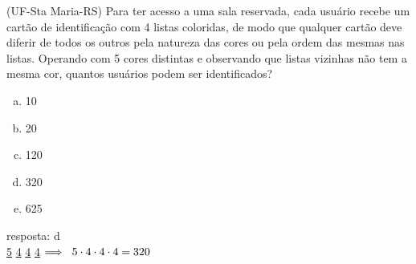 \begin{ex}
 (UF-Sta Maria-RS) Para ter acesso a uma sala reservada, cada usuário recebe um cartão de identificação com 4 listas coloridas, de modo que qualquer cartão deve diferir de todos os outros pela natureza das cores ou pela ordem das mesmas nas listas. Operando com 5 cores distintas e observando que listas vizinhas não tem a mesma cor, quantos usuários podem ser identificados?
    \begin{enumerate}[(a)]
    \item 10
    \item 20
    \item 120
    \item 320
    \item 625
    \end{enumerate}
      \begin{sol}
      resposta: d  \\
        \underline{5}\hspace{0.2cm} \underline{4} \hspace{0.2cm}  \underline{4} \hspace{0.2cm}  \underline{4} $\Longrightarrow \hspace{0.2cm}  5\cdot4\cdot4\cdot4=320$
      \end{sol}
\end{ex}